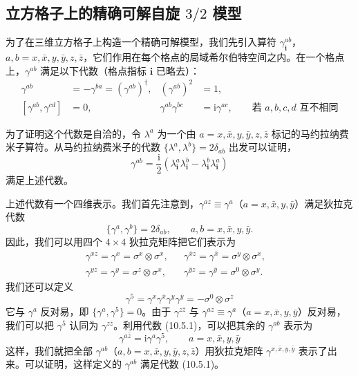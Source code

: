 \subsection{立方格子上的精确可解自旋 $3/2$ 模型}

为了在三维立方格子上构造一个精确可解模型，我们先引入算符 $\gamma_{\pmb{i}}^{ab}$，$a,b=x,\bar{x},y,\bar{y},z,\bar{z}$，它们作用在每个格点的局域希尔伯特空间之内。在一个格点上，$\gamma^{ab}$ 满足以下代数（格点指标 $\pmb{i}$ 已略去）：
\begin{align*}
\gamma^{ab}&=-\gamma^{ba}=(\gamma^{ab})^{\dagger}, & (\gamma^{ab})^{2}&=1, \tag{10.5.1}\\
[\gamma^{ab},\gamma^{cd}]&=0, & \gamma^{ab}\gamma^{bc}&=\mathrm{i}\gamma^{ac}, \qquad \text{若 } a,b,c,d \text{ 互不相同}
\end{align*}

为了证明这个代数是自洽的，令 $\lambda^{a}$ 为一个由 $a=x,\bar{x},y,\bar{y},z,\bar{z}$ 标记的马约拉纳费米子算符。从马约拉纳费米子的代数 $\{\lambda^{a},\lambda^{b}\}=2\delta_{ab}$ 出发可以证明，
\begin{equation*}
\gamma^{ab}=\frac{\mathrm{i}}{2}\left(\lambda_{\pmb{i}}^{a}\lambda_{\pmb{i}}^{b}-\lambda_{\pmb{i}}^{b}\lambda_{\pmb{i}}^{a}\right)
\end{equation*}
满足上述代数。

上述代数有一个四维表示。我们首先注意到，$\gamma^{az}\equiv\gamma^{a}$（$a=x,\bar{x},y,\bar{y}$）满足狄拉克代数
\begin{equation*}
\{\gamma^{a},\gamma^{b}\}=2\delta_{ab}, \qquad a,b=x,\bar{x},y,\bar{y}. \tag{10.5.2}
\end{equation*}
因此，我们可以用四个 $4\times4$ 狄拉克矩阵把它们表示为
\begin{align*}
\gamma^{xz}=\gamma^{x}=\sigma^{x}\otimes\sigma^{x}, & & \gamma^{\bar{x}z}=\gamma^{\bar{x}}=\sigma^{y}\otimes\sigma^{x}, &\\
\gamma^{yz}=\gamma^{y}=\sigma^{z}\otimes\sigma^{x}, & & \gamma^{\bar{y}z}=\gamma^{\bar{y}}=\sigma^{0}\otimes\sigma^{y}. & \tag{10.5.3}
\end{align*}
我们还可以定义
\begin{equation*}
\gamma^{5}=\gamma^{x}\gamma^{\bar{x}}\gamma^{y}\gamma^{\bar{y}}=-\sigma^{0}\otimes\sigma^{z}
\end{equation*}
它与 $\gamma^{a}$ 反对易，即 $\{\gamma^{a},\gamma^{5}\}=0$。由于 $\gamma^{z\bar{z}}$ 与 $\gamma^{az}\equiv\gamma^{a}$（$a=x,\bar{x},y,\bar{y}$）反对易，我们可以把 $\gamma^{5}$ 认同为 $\gamma^{z\bar{z}}$。利用代数 (10.5.1)，可以把其余的 $\gamma^{ab}$ 表示为
\begin{equation*}
\gamma^{a\bar{z}}=\mathrm{i}\gamma^{a}\gamma^{5}, \qquad a=x,\bar{x},y,\bar{y}
\end{equation*}
这样，我们就把全部 $\gamma^{ab}$（$a,b=x,\bar{x},y,\bar{y},z,\bar{z}$）用狄拉克矩阵 $\gamma^{x,\bar{x},y,\bar{y}}$ 表示了出来。可以证明，这样定义的 $\gamma^{ab}$ 满足代数 (10.5.1)。

